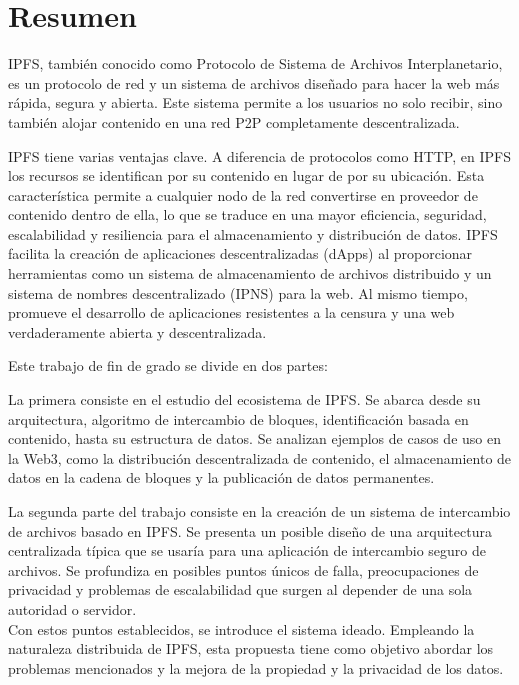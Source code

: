 \chapter*{Resumen}

IPFS, también conocido como Protocolo de Sistema de Archivos Interplanetario,
es un protocolo de red y un sistema de archivos diseñado para hacer
la web más rápida, segura y abierta. Este sistema permite a los usuarios no
solo recibir, sino también alojar contenido en una red P2P completamente descentralizada.

IPFS tiene varias ventajas clave. A diferencia de protocolos como HTTP, en IPFS los recursos se identifican
por su contenido en lugar de por su ubicación. Esta característica permite a cualquier nodo de la red
convertirse en proveedor de contenido dentro de ella, lo que se traduce en una mayor eficiencia, seguridad,
escalabilidad y resiliencia para el almacenamiento y distribución de datos.
IPFS facilita la creación de aplicaciones descentralizadas (dApps) al proporcionar herramientas como
un sistema de almacenamiento de archivos distribuido y un sistema de nombres descentralizado (IPNS) para la web. Al mismo tiempo, promueve el desarrollo de aplicaciones resistentes a la censura y una web verdaderamente abierta y descentralizada.

Este trabajo de fin de grado se divide en dos partes:

La primera consiste en el estudio del ecosistema de IPFS. Se abarca desde su arquitectura, algoritmo de intercambio de bloques,
identificación basada en contenido, hasta su estructura de datos. Se analizan ejemplos de casos de uso en la
Web3, como la distribución descentralizada de contenido, el almacenamiento de datos en la cadena de bloques y
la publicación de datos permanentes.

La segunda parte del trabajo consiste en la creación de un sistema de intercambio de archivos basado en IPFS.
Se presenta un posible diseño de una arquitectura centralizada típica que se usaría para una aplicación de intercambio seguro de archivos.
Se profundiza en posibles puntos únicos de falla, preocupaciones de privacidad y problemas de escalabilidad que surgen al depender de una sola autoridad o servidor.
\\Con estos puntos establecidos, se introduce el sistema ideado. Empleando la naturaleza distribuida de IPFS, esta propuesta tiene como objetivo abordar los problemas mencionados y la mejora de la propiedad y la privacidad de los datos.

